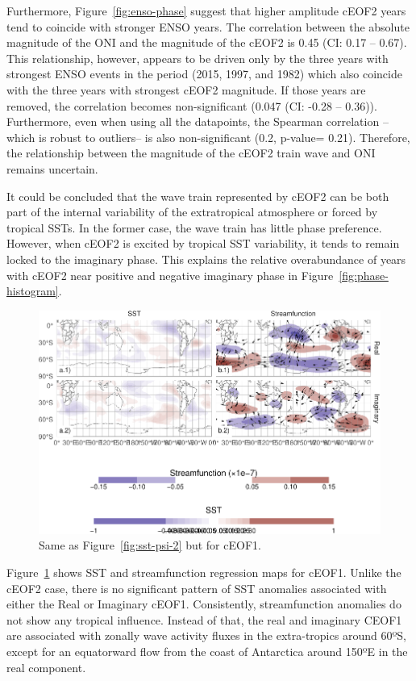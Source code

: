 \documentclass[smallextended]{svjour3}       %
\begin{document}
Furthermore, Figure~\ref{fig:enso-phase} suggest that higher amplitude cEOF2 years tend to coincide with stronger ENSO years.
The correlation between the absolute magnitude of the ONI and the magnitude of the cEOF2 is 0.45 (CI: 0.17 -- 0.67).
This relationship, however, appears to be driven only by the three years with strongest ENSO events in the period (2015, 1997, and 1982) which also coincide with the three years with strongest cEOF2 magnitude.
If those years are removed, the correlation becomes non-significant (0.047 (CI: -0.28 -- 0.36)).
Furthermore, even when using all the datapoints, the Spearman correlation --which is robust to outliers-- is also non-significant (0.2, p-value= 0.21).
Therefore, the relationship between the magnitude of the cEOF2 train wave and ONI remains uncertain.

It could be concluded that the wave train represented by cEOF2 can be both part of the internal variability of the extratropical atmosphere or forced by tropical SSTs.
In the former case, the wave train has little phase preference.
However, when cEOF2 is excited by tropical SST variability, it tends to remain locked to the imaginary phase.
This explains the relative overabundance of years with cEOF2 near positive and negative imaginary phase in Figure~\ref{fig:phase-histogram}.



\begin{figure}
\includegraphics{../figures/sst-psi-1-1} \caption{Same as Figure~\ref{fig:sst-psi-2} but for cEOF1.}\label{fig:sst-psi-1}
\end{figure}

Figure~\ref{fig:sst-psi-1} shows SST and streamfunction regression maps for cEOF1.
Unlike the cEOF2 case, there is no significant pattern of SST anomalies associated with either the Real or Imaginary cEOF1.
Consistently, streamfunction anomalies do not show any tropical influence.
Instead of that, the real and imaginary CEOF1 are associated with zonally wave activity fluxes in the extra-tropics around 60ºS, except for an equatorward flow from the coast of Antarctica around 150ºE in the real component.
\end{document}
